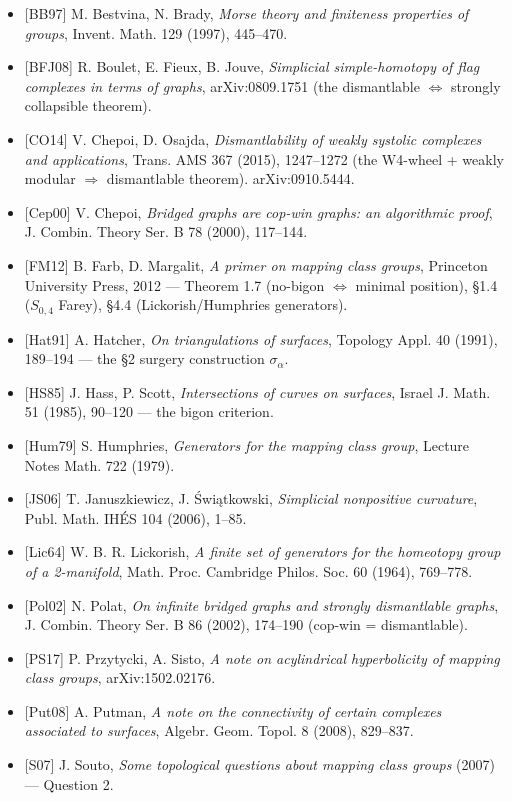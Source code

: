 \documentclass[
]{article}
\providecommand{\tightlist}{%
  \setlength{\itemsep}{0pt}\setlength{\parskip}{0pt}}
\begin{document}
\begin{itemize}
\tightlist
\item
  {[}BB97{]} M. Bestvina, N. Brady, \emph{Morse theory and finiteness
  properties of groups}, Invent. Math. 129 (1997), 445--470.
\item
  {[}BFJ08{]} R. Boulet, E. Fieux, B. Jouve, \emph{Simplicial
  simple-homotopy of flag complexes in terms of graphs}, arXiv:0809.1751
  (the dismantlable \(\Leftrightarrow\) strongly collapsible theorem).
\item
  {[}CO14{]} V. Chepoi, D. Osajda, \emph{Dismantlability of weakly
  systolic complexes and applications}, Trans. AMS 367 (2015),
  1247--1272 (the W4-wheel + weakly modular \(\Rightarrow\) dismantlable
  theorem). arXiv:0910.5444.
\item
  {[}Cep00{]} V. Chepoi, \emph{Bridged graphs are cop-win graphs: an
  algorithmic proof}, J. Combin. Theory Ser. B 78 (2000), 117--144.
\item
  {[}FM12{]} B. Farb, D. Margalit, \emph{A primer on mapping class
  groups}, Princeton University Press, 2012 --- Theorem 1.7 (no-bigon
  \(\Leftrightarrow\) minimal position), §1.4 (\(S_{0,4}\) Farey), §4.4
  (Lickorish/Humphries generators).
\item
  {[}Hat91{]} A. Hatcher, \emph{On triangulations of surfaces}, Topology
  Appl. 40 (1991), 189--194 --- the §2 surgery construction
  \(\sigma_\alpha\).
\item
  {[}HS85{]} J. Hass, P. Scott, \emph{Intersections of curves on
  surfaces}, Israel J. Math. 51 (1985), 90--120 --- the bigon criterion.
\item
  {[}Hum79{]} S. Humphries, \emph{Generators for the mapping class
  group}, Lecture Notes Math. 722 (1979).
\item
  {[}JS06{]} T. Januszkiewicz, J. Świątkowski, \emph{Simplicial
  nonpositive curvature}, Publ. Math. IHÉS 104 (2006), 1--85.
\item
  {[}Lic64{]} W. B. R. Lickorish, \emph{A finite set of generators for
  the homeotopy group of a 2-manifold}, Math. Proc. Cambridge Philos.
  Soc. 60 (1964), 769--778.
\item
  {[}Pol02{]} N. Polat, \emph{On infinite bridged graphs and strongly
  dismantlable graphs}, J. Combin. Theory Ser. B 86 (2002), 174--190
  (cop-win = dismantlable).
\item
  {[}PS17{]} P. Przytycki, A. Sisto, \emph{A note on acylindrical
  hyperbolicity of mapping class groups}, arXiv:1502.02176.
\item
  {[}Put08{]} A. Putman, \emph{A note on the connectivity of certain
  complexes associated to surfaces}, Algebr. Geom. Topol. 8 (2008),
  829--837.
\item
  {[}S07{]} J. Souto, \emph{Some topological questions about mapping
  class groups} (2007) --- Question 2.
\end{itemize}
\end{document}
